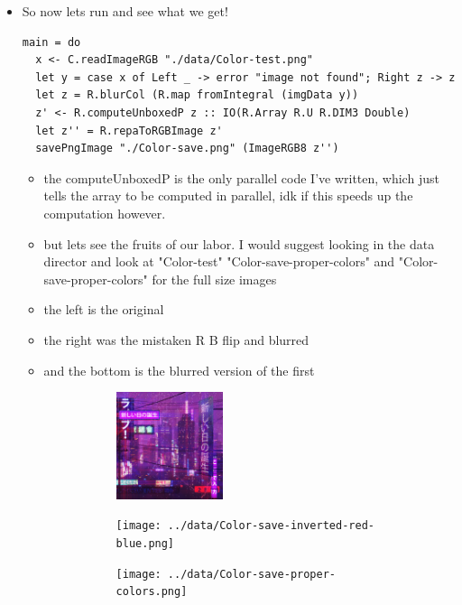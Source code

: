 \documentclass{article}
\begin{document}
\begin{enumerate}
\begin{enumerate}
\begin{itemize}
\item So now lets run and see what we get!
\begin{verbatim}
main = do
  x <- C.readImageRGB "./data/Color-test.png"
  let y = case x of Left _ -> error "image not found"; Right z -> z
  let z = R.blurCol (R.map fromIntegral (imgData y))
  z' <- R.computeUnboxedP z :: IO(R.Array R.U R.DIM3 Double)
  let z'' = R.repaToRGBImage z'
  savePngImage "./Color-save.png" (ImageRGB8 z'')
\end{verbatim}
\begin{itemize}
\item the computeUnboxedP is the only parallel code I've written, which
just tells the array to be computed in parallel, idk if this
speeds up the computation however.
\item but lets see the fruits of our labor. I would suggest looking in
the data director and look at "Color-test"
"Color-save-proper-colors" and "Color-save-proper-colors" for the
full size images
\item the left is the original
\item the right was the mistaken R B flip and blurred
\item and the bottom is the blurred version of the first
\begin{figure}
  \centering
  \begin{subfigure}
    \centering
    \includegraphics[width=0.4\textwidth]{../data/Color-test.png}
  \end{subfigure}%
  \begin{subfigure}
    \centering
    \texttt{[image: ../data/Color-save-inverted-red-blue.png]}
  \end{subfigure}
  \begin{subfigure}
    \centering
    \texttt{[image: ../data/Color-save-proper-colors.png]}
  \end{subfigure}
\end{figure}
\end{itemize}
\end{itemize}
\end{enumerate}
\end{enumerate}
\end{document}
